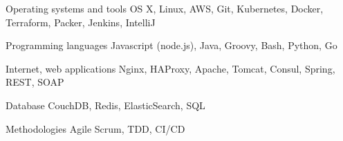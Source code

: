 
\begin{cvskills}

  \cvskill
    {Operating systems and tools} %
    {OS X, Linux, AWS, Git, Kubernetes, Docker, Terraform, Packer, Jenkins, IntelliJ} %

  \cvskill
    {Programming languages} %
    {Javascript (node.js), Java, Groovy, Bash, Python, Go} %

  \cvskill
    {Internet, web applications} %
    {Nginx, HAProxy, Apache, Tomcat, Consul, Spring, REST, SOAP} %

  \cvskill
    {Database} %
    {CouchDB, Redis, ElasticSearch, SQL} %

  \cvskill
    {Methodologies} %
    {Agile Scrum, TDD, CI/CD} %

\end{cvskills}